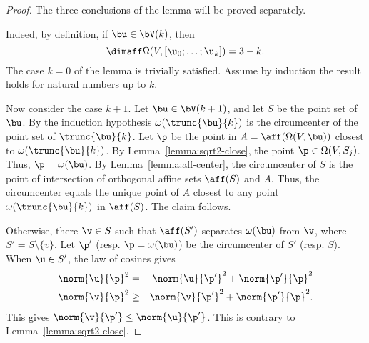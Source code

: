 \begin{proof} The three conclusions of the lemma will be proved
separately.

 Indeed, by
definition, if $\bu\in \bV(k)$, then
\begin{displaymath} 
\dimaff\Omega(V,[\u_0;\ldots;\u_k]) = 3-k.
\end{displaymath}  
The case $k=0$ of the lemma is trivially
satisfied.  Assume by induction the result holds for natural numbers up to $k$.

Now consider the case $k+1$.  Let $\bu\in \bV(k+1)$, and let $S$ be
the point set of $\bu$.  By the induction hypothesis
$\omega(\trunc{\bu}{k})$ is the circumcenter of the point set of
$\trunc{\bu}{k}$.  Let $\p$ be the point in
$A=\aff(\Omega(V,\bu))$ closest to $\omega(\trunc{\bu}{k})$.  By
Lemma~\ref{lemma:sqrt2-close}, the point $\p\in\Omega(V,S_{j})$.
Thus, $\p=\omega(\bu)$.  By Lemma~\ref{lemma:aff-center}, the
circumcenter of $S$ is the point of intersection of orthogonal affine
sets $\aff(S)$ and $A$.  Thus, the circumcenter equals the unique
point of $A$ closest to any point $\omega(\trunc{\bu}{k})$ in
$\aff(S)$.  The claim follows.



Otherwise, there $\v\in S$ such that $\aff(S')$ separates $\omega(\bu)$ from
$ \v$, where $S'=S\setminus\{v\}$.  Let $\p'$ (resp. $\p=\omega(\bu)$)
be the circumcenter
of $S'$ (resp. $S$).  When $\u\in S'$, the law of cosines gives
\begin{eqnarray*} 
\norm{ \u}{\p}^2 &=& \norm{\u}{\p'}^2 + \norm{\p'}{\p}^2\\ 
\norm{ \v}{\p}^2 &\ge& \norm{\v}{\p'}^2 + \norm{\p'}{\p}^2.
\end{eqnarray*}
This gives $\norm{\v}{\p'}\le \norm{\u}{\p'}$.  This is contrary to Lemma~\ref{lemma:sqrt2-close}.


\end{proof}
